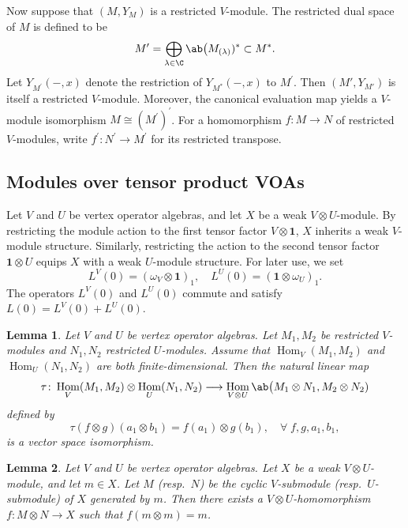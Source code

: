 \documentclass[12pt, english]{article}
\numberwithin{equation}{section}
\DeclareMathOperator{\Hom}{Hom}
\theoremstyle{plain}
\newtheorem{lemma}{Lemma}[section]
\theoremstyle{definition}
\theoremstyle{remark}
\begin{document}
	Now suppose that $(M, Y_M)$ is a restricted $V$-module.
	The restricted dual space of $M$ is defined to be
	\[
	M^{\prime} = \bigoplus_{\lambda \in \C} \ab\big(M_{(\lambda)})^* \subset M^*.
	\]
	Let $Y_{M^\prime}(-, x)$ denote the restriction of $ Y_{M^*}(-, x) $ to $ M^{\prime}$.
	Then $(M', Y_{M'})$ is itself a restricted $V$-module. Moreover, the canonical evaluation map yields a $V$-module isomorphism $M \cong (M^\prime)^\prime$.
	For a homomorphism $f\colon M \to N$ of restricted $V$-modules, write $f^\prime\colon N^\prime \to M^\prime$ for its restricted transpose.
	
	\subsection{Modules over tensor product VOAs}
	
	Let $V$ and $U$ be vertex operator algebras, and let $X$ be a weak $V\otimes U$-module.
	By restricting the module action to the first tensor factor $V\otimes\mathbf{1}$, $X$ inherits a weak $V$-module structure.
	Similarly, restricting the action to the second tensor factor  $\mathbf{1}\otimes U$ equips $X$ with a weak $U$-module structure.
	For later use, we set
	\[
	L^{V}(0) = (\omega_V \otimes \mathbf{1})_1, \quad L^{U}(0) = (\mathbf{1} \otimes \omega_U)_1.
	\]
	The operators $ L^V(0) $ and $ L^{U}(0)$ commute and satisfy $L(0) = L^V(0) + L^U(0).$
	
	\begin{lemma} \cite[Proposition 2.10]{McR23} \label{lem:tensor-product-hom}
		Let $V$ and $U$ be vertex operator algebras. Let $M_1, M_2$ be restricted $V$-modules and
		$N_1, N_2$ restricted $U$-modules.  Assume that $\Hom_V(M_1, M_2)$
		and $\Hom_U(N_1, N_2)$ are both finite-dimensional. Then the natural linear map
		\[
		\tau \colon \Hom_V(M_1, M_2) \otimes \Hom_U(N_1, N_2) \longrightarrow
		\Hom_{V \otimes U} \ab\big(M_1 \otimes N_1, M_2 \otimes N_2)
		\]
		defined by
		\[
		\tau(f \otimes g) (a_1 \otimes b_1) = f(a_1) \otimes g(b_1), \quad \forall \; f, g, a_1, b_1,
		\]
		is a vector space isomorphism.
	\end{lemma}
	
	\begin{lemma} \label{lem:cyclic-tensor-presentation}
		Let $V$ and $U$ be vertex operator algebras. Let $X$ be a weak $V\otimes U$-module, and let $m \in X$.
		Let $M$ (resp.\ $N$) be the cyclic $V$-submodule (resp.\ $U$-submodule) of $X$ generated by $m$.
		Then there exists a $V \otimes U$-homomorphism $f \colon M \otimes N \to X$ such that $f(m\otimes m) = m$.
	\end{lemma}
	
\end{document}
